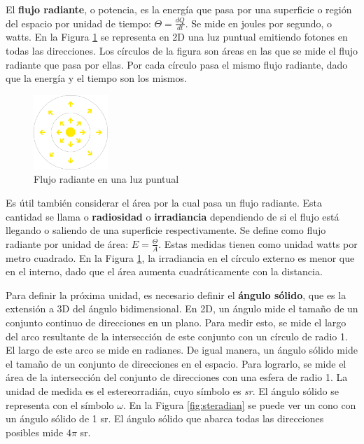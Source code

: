 El \textbf{flujo radiante}, o potencia, es la energía que pasa por una superficie o región del espacio por unidad de tiempo: $\Theta = \frac{dQ}{dt}$.
Se mide en joules por segundo, o watts.
En la Figura \ref{fig:point-light-flux} se representa en 2D una luz puntual emitiendo fotones en todas las direcciones.
Los círculos de la figura son áreas en las que se mide el flujo radiante que pasa por ellas.
Por cada círculo pasa el mismo flujo radiante, dado que la energía y el tiempo son los mismos.

\begin{figure}[ht]
    \centering
    \includegraphics[width=0.25\textwidth]{point-light-flux.png}
    \caption{Flujo radiante en una luz puntual}
    \label{fig:point-light-flux}
\end{figure}

Es útil también considerar el área por la cual pasa un flujo radiante.
Esta cantidad se llama o \textbf{radiosidad} o \textbf{irradiancia} dependiendo de si el flujo está llegando o saliendo de una superficie respectivamente.
Se define como flujo radiante por unidad de área: $E = \frac{\Theta}{A}$.
Estas medidas tienen como unidad watts por metro cuadrado.
En la Figura \ref{fig:point-light-flux}, la irradiancia en el círculo externo es menor que en el interno, dado que el área aumenta cuadráticamente con la distancia.

Para definir la próxima unidad, es necesario definir el \textbf{ángulo sólido}, que es la extensión a 3D del ángulo bidimensional.
En 2D, un ángulo mide el tamaño de un conjunto continuo de direcciones en un plano.
Para medir esto, se mide el largo del arco resultante de la intersección de este conjunto con un círculo de radio 1.
El largo de este arco se mide en radianes.
De igual manera, un ángulo sólido mide el tamaño de un conjunto de direcciones en el espacio.
Para lograrlo, se mide el área de la intersección del conjunto de direcciones con una esfera de radio 1.
La unidad de medida es el estereorradián, cuyo símbolo es \textit{sr}.
El ángulo sólido se representa con el símbolo $\omega$.
En la Figura \ref{fig:steradian} se puede ver un cono con un ángulo sólido de 1 sr.
El ángulo sólido que abarca todas las direcciones posibles mide $4\pi$ sr.


